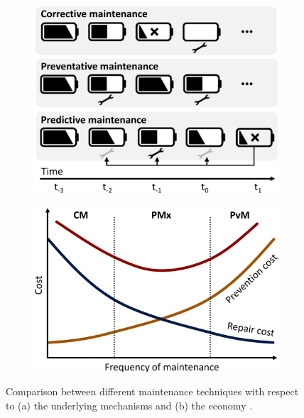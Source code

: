 \documentclass[runningheads]{llncs}
\begin{document}
\begin{figure}[h]
\centering
\begin{subfigure}{.5\textwidth}
  \centering
  \includegraphics[scale=0.45]{Figures/Maintenance_Comparison.jpg}
  \caption{}
  \label{fig:pmxa}
\end{subfigure}%
\begin{subfigure}{.5\textwidth}
  \centering
  \includegraphics[scale=0.47]{Figures/pmx.jpg}
  \caption{}
  \label{fig:pmxb}
\end{subfigure}
\caption{Comparison between different maintenance techniques with respect to (a) the underlying mechanisms and (b) the economy \cite{ran2019survey}.}
\label{fig:pmx}
\end{figure}
\end{document}
